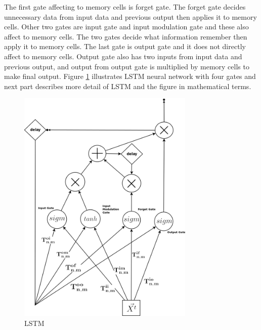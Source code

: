 \documentclass[draft,dvipsnames]{drexel-thesis}
\begin{document}
\begin{thesis}
\begin{enumerate}
	The first gate affecting to memory cells is forget gate. The forget gate decides unnecessary data from input data and previous output then applies it to memory cells. Other two gates are input gate and input modulation gate and these also affect to memory cells. The two gates decide what information remember then apply it to memory cells. The last gate is output gate and it does not directly affect to memory cells. Output gate also has two inputs from input data and previous output, and output from output gate is multiplied by memory cells to make final output. Figure \ref{fig:LSTM} illustrates LSTM neural network with four gates and next part describes more detail of LSTM and the figure in mathematical terms.

\begin{figure}[t!]
    \centering
    \includegraphics[width=0.75\textwidth]{pictures/figures/LSTM.png}
    \caption{LSTM}
    \label{fig:LSTM}
\end{figure}
		
		

\end{enumerate}
\end{thesis}
\end{document}
